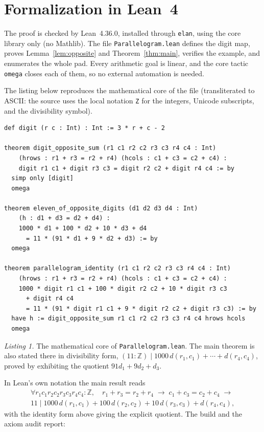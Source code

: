 \documentclass[11pt,a4paper]{article}
\theoremstyle{definition}
\theoremstyle{remark}
\newcommand{\Z}{\mathbb{Z}}
\newcommand{\code}[1]{\texttt{#1}}
\begin{document}
\section{Formalization in Lean~4}
\label{sec:lean}

The proof is checked by Lean~4.36.0, installed through \code{elan}, using the core
library only (no Mathlib). The file \code{Parallelogram.lean} defines the digit map,
proves Lemma~\ref{lem:opposite} and Theorem~\ref{thm:main}, verifies the example,
and enumerates the whole pad. Every arithmetic goal is linear, and the core tactic
\code{omega} closes each of them, so no external automation is needed.

The listing below reproduces the mathematical core of the file (transliterated to
ASCII: the source uses the local notation \code{Z} for the integers, Unicode
subscripts, and the divisibility symbol).

\begin{verbatim}
def digit (r c : Int) : Int := 3 * r + c - 2

theorem digit_opposite_sum (r1 c1 r2 c2 r3 c3 r4 c4 : Int)
    (hrows : r1 + r3 = r2 + r4) (hcols : c1 + c3 = c2 + c4) :
    digit r1 c1 + digit r3 c3 = digit r2 c2 + digit r4 c4 := by
  simp only [digit]
  omega

theorem eleven_of_opposite_digits (d1 d2 d3 d4 : Int)
    (h : d1 + d3 = d2 + d4) :
    1000 * d1 + 100 * d2 + 10 * d3 + d4
      = 11 * (91 * d1 + 9 * d2 + d3) := by
  omega

theorem parallelogram_identity (r1 c1 r2 c2 r3 c3 r4 c4 : Int)
    (hrows : r1 + r3 = r2 + r4) (hcols : c1 + c3 = c2 + c4) :
    1000 * digit r1 c1 + 100 * digit r2 c2 + 10 * digit r3 c3
      + digit r4 c4
      = 11 * (91 * digit r1 c1 + 9 * digit r2 c2 + digit r3 c3) := by
  have h := digit_opposite_sum r1 c1 r2 c2 r3 c3 r4 c4 hrows hcols
  omega
\end{verbatim}
\smallskip
\noindent\textit{Listing 1.} The mathematical core of \code{Parallelogram.lean}. The
main theorem is also stated there in divisibility form,
$(11:\Z)\mid 1000\,d(r_1,c_1)+\cdots+d(r_4,c_4)$, proved by exhibiting the quotient
$91d_1+9d_2+d_3$.

In Lean's own notation the main result reads
\begin{multline*}
\forall r_1c_1r_2c_2r_3c_3r_4c_4:\Z,\quad
r_1+r_3=r_2+r_4 \;\to\; c_1+c_3=c_2+c_4 \;\to\\
11 \mid 1000\,d(r_1,c_1)+100\,d(r_2,c_2)+10\,d(r_3,c_3)+d(r_4,c_4),
\end{multline*}
with the identity form above giving the explicit quotient. The build and the axiom
audit report:
\end{document}

